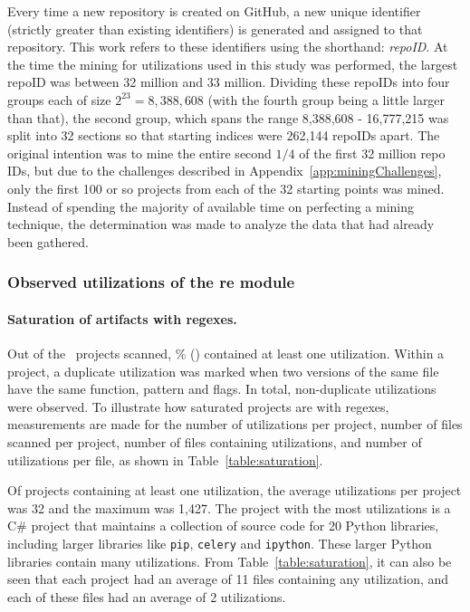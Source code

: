Every time a new repository is created on GitHub, a new unique identifier (strictly greater than existing identifiers) is generated and assigned to that repository.  This work refers to these identifiers using the shorthand: \emph{repoID}.  At the time the mining for utilizations used in this study was performed, the largest repoID was between 32 million and 33 million.  Dividing these repoIDs into four groups each of size $2^{23} = 8,388,608$ (with the fourth group being a little larger than that), the second group, which spans the range 8,388,608 - 16,777,215 was split into 32 sections so that starting indices were 262,144 repoIDs apart.  The original intention was to mine the entire second $1/4$ of the first 32 million repo IDs, but due to the challenges described in Appendix~\ref{app:miningChallenges}, only the first 100 or so projects from each of the 32 starting points was mined.  Instead of spending the majority of available time on perfecting a mining technique, the determination was made to analyze the data that had already been gathered.

\subsubsection{Observed utilizations of the re module}



\paragraph{Saturation of artifacts with regexes.} Out of the \ projects scanned, \% () contained at least one utilization.  Within a project, a duplicate utilization was marked when two versions of the same file have the same function, pattern and flags.  In total,  non-duplicate utilizations were observed.  To illustrate how saturated projects are with regexes, measurements are made for the number of utilizations per project, number of files scanned per project, number of files containing utilizations, and number of utilizations  per file, as shown in Table~\ref{table:saturation}.

Of projects containing at least one utilization, the average utilizations per project was 32 and the maximum  was 1,427.  The project with the most utilizations is a C\# project that maintains a collection of source code for 20 Python libraries, including larger libraries like {\tt pip}, {\tt celery} and {\tt ipython}.  These larger Python libraries contain many utilizations.
From Table~\ref{table:saturation}, it can also be seen that each project had an average of 11 files containing any utilization, and each of these files had an average of 2 utilizations.

